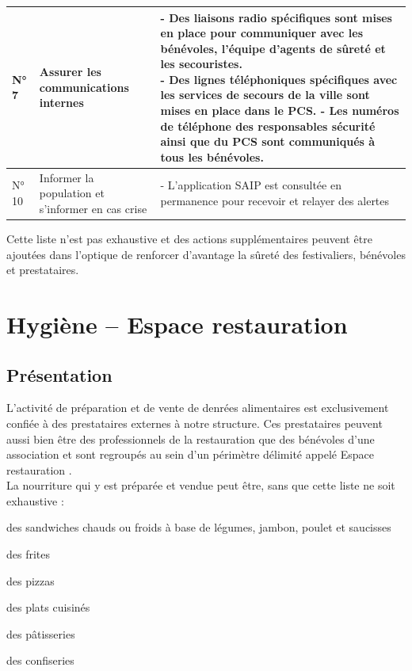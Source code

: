 \documentclass[hidelinks, paper=a4, fontsize=13pt]{report}
\begin{document}
\begin{center}
\begin{tabular}{| p{1.5cm} | p{4cm} | p{10cm} |}
 \\
 \hline
  N° 7 &
  \parbox[t]{4cm}{Assurer les communications internes} & 
  \parbox[t]{10cm}{- Des liaisons radio spécifiques sont mises en place pour communiquer avec les bénévoles, l'équipe d'agents de sûreté et les secouristes.\\
  - Des lignes téléphoniques spécifiques avec les services de secours de la ville sont mises en place dans le PCS.
  - Les numéros de téléphone des responsables sécurité ainsi que du PCS sont communiqués à tous les bénévoles.\\}
 \\
 \hline
  N° 10 &
  \parbox[t]{4cm}{Informer la population et s'informer en cas crise\\}  & 
  \parbox[t]{10cm}{- L'application SAIP est consultée en permanence pour recevoir et relayer des alertes}
 \\
 \hline 
\end{tabular}
\end{center}

Cette liste n'est pas exhaustive et des actions supplémentaires peuvent être ajoutées dans l'optique de renforcer d'avantage la sûreté des festivaliers, bénévoles et prestataires.


\newpage
\chapter{Hygiène – Espace restauration}

\section{Présentation}

L'activité de préparation et de vente de denrées alimentaires est exclusivement confiée à des prestataires externes à notre structure. Ces prestataires peuvent aussi bien être des professionnels de la restauration que des bénévoles d'une association et sont regroupés au sein d'un périmètre délimité appelé \og Espace restauration \fg. \\

La nourriture qui y est préparée et vendue peut être, sans que cette liste ne soit exhaustive :
\begin{list}{•}{}
	\item des sandwiches chauds ou froids à base de légumes, jambon, poulet et saucisses
	\item des frites
	\item des pizzas
	\item des plats cuisinés
	\item des pâtisseries
	\item des confiseries
\end{list}
\end{document}

